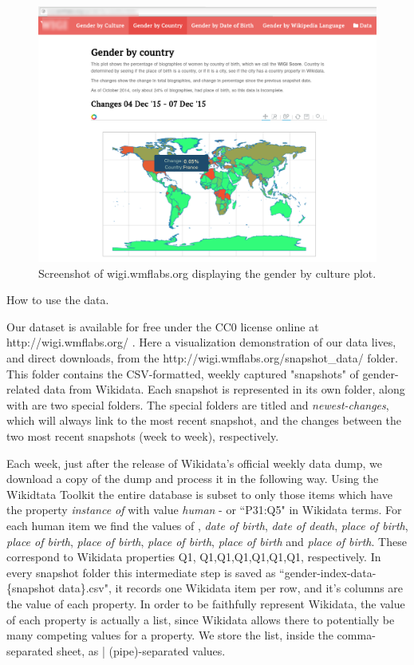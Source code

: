 \documentclass[letterpaper]{article}
\begin{document}
\begin{figure}
\label{fig:screenshot}
\includegraphics[scale=0.6]{figures/website_screenshot.png} 
\caption{Screenshot of wigi.wmflabs.org displaying the gender by culture plot.}
\end{figure}

How to use the data.

Our dataset is available for free under the CC0 license online at  http://wigi.wmflabs.org/ . Here a visualization demonstration of our data lives, and direct downloads, from the http://wigi.wmflabs.org/snapshot_data/ folder. 	This folder contains the CSV-formatted, weekly captured "snapshots" of gender-related data from Wikidata. Each snapshot is represented in its own folder, along with are two special folders. The special folders are titled  and \textit{newest-changes}, which will always link to the most recent snapshot, and the changes between the two most recent snapshots (week to week), respectively.

Each week, just after the release of Wikidata's official weekly data dump, we download a copy of the dump and process it in the following way. Using the Wikidtata Toolkit \cite{kroetsch} the entire database is subset to only those items which have the property \textit{instance of} with value \textit{human} - or ``P31:Q5" in Wikidata terms. For each human item we find the values of , \textit{date of birth}, \textit{date of death}, \textit{place of birth}, \textit{place of birth}, \textit{place of birth}, \textit{place of birth}, \textit{place of birth} and \textit{place of birth}. These correspond to Wikidata properties Q1, Q1,Q1,Q1,Q1,Q1,Q1, respectively. In every snapshot folder this intermediate step is saved as ``gender-index-data-\{snapshot data\}.csv", it records one Wikidata item per row, and it's columns are the value of each property. In order to be faithfully represent Wikidata, the value of each property is actually a list, since Wikidata allows there to potentially be many competing values for a property. We store the list, inside the comma-separated sheet, as | (pipe)-separated values. 
 
\end{document}
